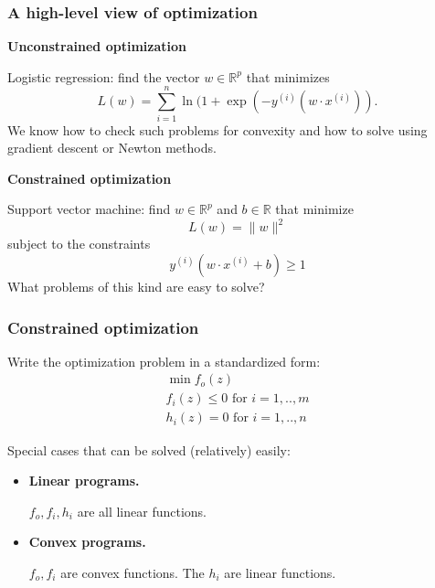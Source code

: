 \documentclass[smaller]{beamer}
\def\R{{\mathbb R}}
\def\darkred{\color{red!70!black}}
\def\darkgreen{\color{green!60!black}}
\def\v2{{\vskip.2in}}
\def\R{{\mathbb R}}
\begin{document}
\begin{frame}
\frametitle{A high-level view of optimization}

\alert{\bf Unconstrained optimization}

Logistic regression: find the vector $w \in \R^p$ that minimizes
$$ L(w) = \sum_{i=1}^n \ln (1 + \exp(- y^{(i)} (w \cdot x^{(i)})) .$$
{\darkgreen We know how to check such problems for convexity and how to solve using gradient descent or Newton methods.}

\pause\v2
\alert{\bf Constrained optimization}

Support vector machine: find $w \in \R^p$ and $b \in \R$ that minimize
$$ L(w) = \|w\|^2$$
subject to the constraints
$$ y^{(i)} (w \cdot x^{(i)} + b) \geq 1 $$
{\darkgreen What problems of this kind are easy to solve?}

\end{frame}

\begin{frame}
\frametitle{Constrained optimization}

{\darkred Write the optimization problem in a standardized form:
\begin{gather*}
\min f_o(z) \\
f_i(z) \leq 0 \mbox{\ \ for $i=1,..,m$} \\
h_i(z) = 0    \mbox{\ \ for $i=1,..,n$}
\end{gather*}}

Special cases that can be solved (relatively) easily:
\begin{itemize}
\item {\bf Linear programs.}

{\darkgreen $f_o, f_i, h_i$ are all linear functions.}

\item {\bf Convex programs.}

{\darkgreen $f_o, f_i$ are convex functions. The $h_i$ are linear functions.}

\end{itemize}

\end{frame}
\end{document}
